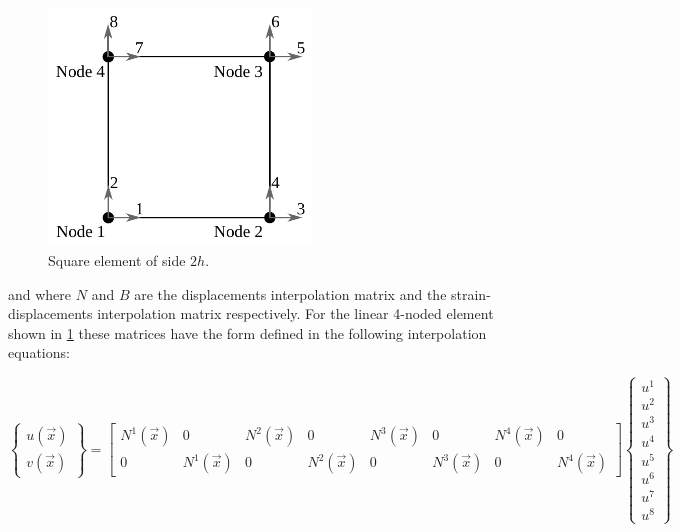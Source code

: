 \begin{figure}[H]
\centering
\includegraphics[width=7cm]{lado2h.pdf}
\caption{Square element of side $2h$.}
\label{fig:lado2h}
\end{figure}


and where $N$ and $B$ are the displacements interpolation matrix and the strain-displacements interpolation matrix respectively. For the linear 4-noded element shown in \cref{fig:lado2h} these matrices have the form defined in the following interpolation equations:


\[\left\{ {\begin{array}{*{20}{c}}
{u(\vec x)}\\
{v(\vec x)}
\end{array}} \right\} = \left[ {\begin{array}{*{20}{c}}
{{N^1}(\vec x)}&0&{{N^2}(\vec x)}&0&{{N^3}(\vec x)}&0&{{N^4}(\vec x)}&0\\
0&{{N^1}(\vec x)}&0&{{N^2}(\vec x)}&0&{{N^3}(\vec x)}&0&{{N^4}(\vec x)}
\end{array}} \right]\left\{ {\begin{array}{*{20}{c}}
{{u^1}}\\
{{u^2}}\\
{{u^3}}\\
{{u^4}}\\
{{u^5}}\\
{{u^6}}\\
{{u^7}}\\
{{u^8}}
\end{array}} \right\}\]


